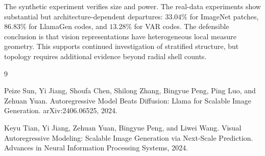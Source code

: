 \documentclass[11pt]{article}
\begin{document}
The synthetic experiment verifies size and power. The real-data experiments
show substantial but architecture-dependent departures: $33.04\%$ for
ImageNet patches, $86.83\%$ for LlamaGen codes, and $13.28\%$ for VAR codes.
The defensible conclusion is that vision representations have heterogeneous
local measure geometry. This supports continued investigation of stratified
structure, but topology requires additional evidence beyond radial shell
counts.

\begin{thebibliography}{9}
\footnotesize
\setlength{\itemsep}{0.25em}

Peize Sun, Yi Jiang, Shoufa Chen, Shilong Zhang, Bingyue Peng, Ping Luo, and
Zehuan Yuan.
\newblock Autoregressive Model Beats Diffusion: Llama for Scalable Image
Generation.
\newblock arXiv:2406.06525, 2024.

Keyu Tian, Yi Jiang, Zehuan Yuan, Bingyue Peng, and Liwei Wang.
\newblock Visual Autoregressive Modeling: Scalable Image Generation via
Next-Scale Prediction.
\newblock Advances in Neural Information Processing Systems, 2024.

\end{thebibliography}
\end{document}
